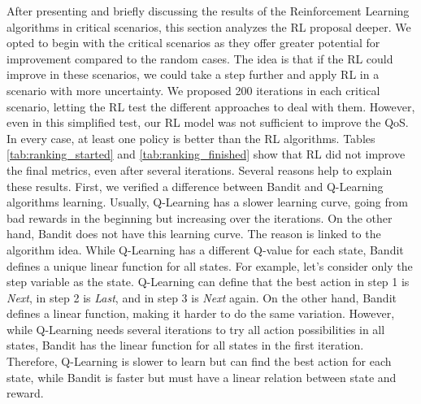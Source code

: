 After presenting and briefly discussing the results of the Reinforcement Learning algorithms in critical scenarios, this section analyzes the RL proposal deeper. We opted to begin with the critical scenarios as they offer greater potential for improvement compared to the random cases. The idea is that if the RL could improve in these scenarios, we could take a step further and apply RL in a scenario with more uncertainty. We proposed 200 iterations in each critical scenario, letting the RL test the different approaches to deal with them. However, even in this simplified test, our RL model was not sufficient to improve the QoS. In every case, at least one policy is better than the RL algorithms. Tables \ref{tab:ranking_started} and \ref{tab:ranking_finished} show that RL did not improve the final metrics, even after several iterations. Several reasons help to explain these results. First, we verified a difference between Bandit and Q-Learning algorithms learning. Usually, Q-Learning has a slower learning curve, going from bad rewards in the beginning but increasing over the iterations. On the other hand, Bandit does not have this learning curve. The reason is linked to the algorithm idea. While Q-Learning has a different Q-value for each state, Bandit defines a unique linear function for all states. For example, let's consider only the step variable as the state. Q-Learning can define that the best action in step 1 is \emph{Next}, in step 2 is \emph{Last}, and in step 3 is \emph{Next} again. On the other hand, Bandit defines a linear function, making it harder to do the same variation. However, while Q-Learning needs several iterations to try all action possibilities in all states, Bandit has the linear function for all states in the first iteration. Therefore, Q-Learning is slower to learn but can find the best action for each state, while Bandit is faster but must have a linear relation between state and reward. 



